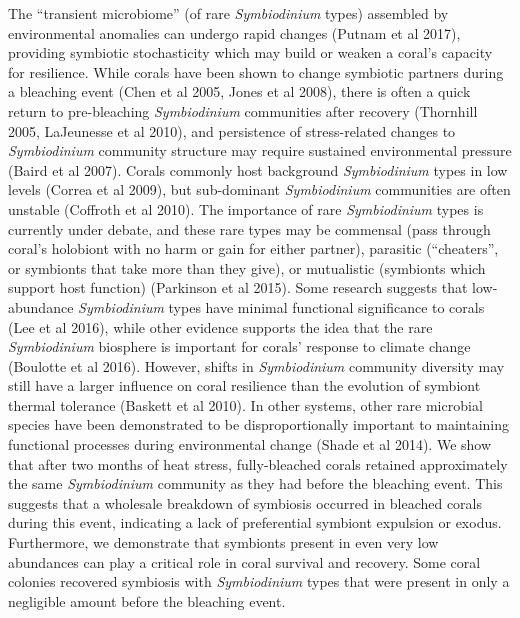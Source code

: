 \documentclass[]{article}
\begin{document}
The ``transient microbiome'' (of rare \emph{Symbiodinium} types)
assembled by environmental anomalies can undergo rapid changes (Putnam
et al 2017), providing symbiotic stochasticity which may build or weaken
a coral's capacity for resilience. While corals have been shown to
change symbiotic partners during a bleaching event (Chen et al 2005,
Jones et al 2008), there is often a quick return to pre-bleaching
\emph{Symbiodinium} communities after recovery (Thornhill 2005,
LaJeunesse et al 2010), and persistence of stress-related changes to
\emph{Symbiodinium} community structure may require sustained
environmental pressure (Baird et al 2007). Corals commonly host
background \emph{Symbiodinium} types in low levels (Correa et al 2009),
but sub-dominant \emph{Symbiodinium} communities are often unstable
(Coffroth et al 2010). The importance of rare \emph{Symbiodinium} types
is currently under debate, and these rare types may be commensal (pass
through coral's holobiont with no harm or gain for either partner),
parasitic (``cheaters'', or symbionts that take more than they give), or
mutualistic (symbionts which support host function) (Parkinson et al
2015). Some research suggests that low-abundance \emph{Symbiodinium}
types have minimal functional significance to corals (Lee et al 2016),
while other evidence supports the idea that the rare \emph{Symbiodinium}
biosphere is important for corals' response to climate change (Boulotte
et al 2016). However, shifts in \emph{Symbiodinium} community diversity
may still have a larger influence on coral resilience than the evolution
of symbiont thermal tolerance (Baskett et al 2010). In other systems,
other rare microbial species have been demonstrated to be
disproportionally important to maintaining functional processes during
environmental change (Shade et al 2014). We show that after two months
of heat stress, fully-bleached corals retained approximately the same
\emph{Symbiodinium} community as they had before the bleaching event.
This suggests that a wholesale breakdown of symbiosis occurred in
bleached corals during this event, indicating a lack of preferential
symbiont expulsion or exodus. Furthermore, we demonstrate that symbionts
present in even very low abundances can play a critical role in coral
survival and recovery. Some coral colonies recovered symbiosis with
\emph{Symbiodinium} types that were present in only a negligible amount
before the bleaching event.
\end{document}
